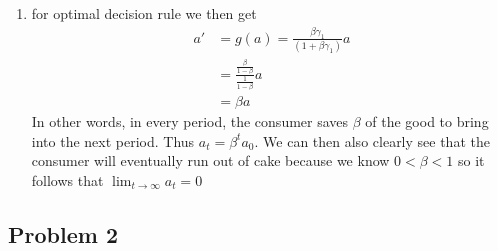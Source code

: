 \documentclass[12pt]{article}
\begin{document}
\begin{enumerate}
      \item for optimal decision rule we then get
	      \begin{align*}
		      a' &= g(a) = \frac{\beta \gamma_1}{(1 + \beta \gamma_1)} a \\
	      &= \frac{\frac{\beta}{1 - \beta}}{\frac{1}{1 - \beta }} a \\
	      & = \beta a
      \end{align*}
In other words, in every period, the consumer saves $\beta$ of the good to bring into the next period.
Thus $a_t = \beta^t a_0$. We can then also clearly see that the consumer will eventually run out of cake because we know  $0 <\beta < 1$ so it follows that  $\lim_{t \to \infty} a_t = 0$
\end{enumerate} 


\subsection*{Problem 2}
\end{document}
